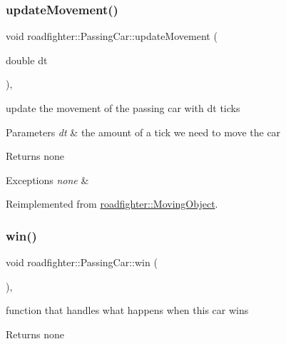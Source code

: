 \subsubsection{\texorpdfstring{update\+Movement()}{updateMovement()}}
{\footnotesize\ttfamily void roadfighter\+::\+Passing\+Car\+::update\+Movement (\begin{DoxyParamCaption}\item[{double}]{dt }\end{DoxyParamCaption})\hspace{0.3cm}{\ttfamily [override]}, {\ttfamily [virtual]}}

update the movement of the passing car with dt ticks 
\begin{DoxyParams}{Parameters}
{\em dt} & the amount of a tick we need to move the car \\
\hline
\end{DoxyParams}
\begin{DoxyReturn}{Returns}
none 
\end{DoxyReturn}

\begin{DoxyExceptions}{Exceptions}
{\em none} & \\
\hline
\end{DoxyExceptions}


Reimplemented from \hyperlink{classroadfighter_1_1MovingObject_ac1918d96dac118c4bd7d99168d92867c}{roadfighter\+::\+Moving\+Object}.

\mbox{\label{classroadfighter_1_1PassingCar_a365d8befb1c2fd34337fc25665ccc73f}} 
\subsubsection{\texorpdfstring{win()}{win()}}
{\footnotesize\ttfamily void roadfighter\+::\+Passing\+Car\+::win (\begin{DoxyParamCaption}{ }\end{DoxyParamCaption})\hspace{0.3cm}{\ttfamily [override]}, {\ttfamily [virtual]}}

function that handles what happens when this car wins \begin{DoxyReturn}{Returns}
none 
\end{DoxyReturn}

